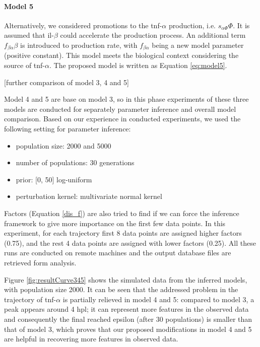 \paragraph{Model 5} Alternatively, we considered promotions to the tnf-$\alpha$ production, i.e. $s_{\alpha\Phi}\Phi$. It is assumed that il-$\beta$ could accelerate the production process. An additional term $f_{\beta\alpha}\beta$ is introduced to production rate, with $f_{\beta\alpha}$ being a new model parameter (positive constant). This model meets the biological context considering the source of tnf-$\alpha$. The proposed model is written as Equation \ref{eq:model5}.

[further comparison of model 3, 4 and 5]

Model 4 and 5 are base on model 3, so in this phase experiments of these three models are conducted for separately parameter inference and overall model comparison. Based on our experience in conducted experiments, we used the following setting for parameter inference:

\begin{itemize}
    \item population size: 2000 and 5000
    \item number of populations: 30 generations
    \item prior: [0, 50] log-uniform
    \item perturbation kernel: multivariate normal kernel
\end{itemize}

Factors (Equation \ref{dis_f}) are also tried to find if we can force the inference framework to give more importance on the first few data points. In this experiment, for each trajectory first 8 data points are assigned higher factors (0.75), and the rest 4 data points are assigned with lower factors (0.25). All these runs are conducted on remote machines and the output database files are retrieved form analysis.

Figure \ref{fig:resultCurve345} shows the simulated data from the inferred models, with population size 2000. It can be seen that the addressed problem in the trajectory of tnf-$\alpha$ is partially relieved in model 4 and 5: compared to model 3, a peak appears around 4 hpl; it can represent more features in the observed data and consequently the final reached epsilon (after 30 populations) is smaller than that of model 3, which proves that our proposed modifications in model 4 and 5 are helpful in recovering more features in observed data.

